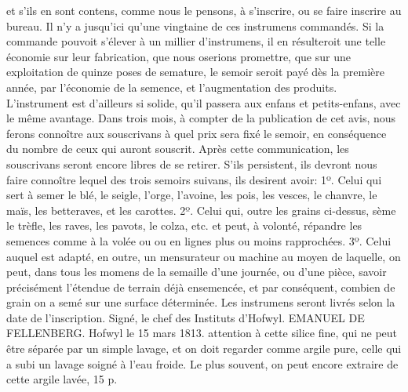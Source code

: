 \setcounter{page}{112} et s'ils en sont contens, comme nous le pensons, à s'inscrire, ou se faire inscrire au bureau. Il n'y a jusqu'ici qu'une vingtaine de ces instrumens commandés. Si la commande pouvoit s'élever à un millier d'instrumens, il en résulteroit une telle économie sur leur fabrication, que nous oserions promettre, que sur une exploitation de quinze poses de semature, le semoir seroit payé dès la première année, par l'économie de la semence, et l'augmentation des produits. L'instrument est d'ailleurs si solide, qu'il passera aux enfans et petits-enfans, avec le même avantage.
Dans trois mois, à compter de la publication de cet avis, nous ferons connoître aux souscrivans à quel prix sera fixé le semoir, en conséquence du nombre de ceux qui auront souscrit. Après cette communication, les souscrivans seront encore libres de se retirer. S'ils persistent, ils devront nous faire connoître lequel des trois semoirs suivans, ils desirent avoir:
1º. Celui qui sert à semer le blé, le seigle, l'orge, l'avoine, les pois, les vesces, le chanvre, le maïs, les betteraves, et les carottes.
2º. Celui qui, outre les grains ci-dessus, sème le trèfle, les raves, les pavots, le colza, etc. et peut, à volonté, répandre les semences comme à la volée ou ou en lignes plus ou moins rapprochées.
3º. Celui auquel est adapté, en outre, un mensurateur ou machine au moyen de laquelle, on peut, dans tous les momens de la semaille d'une journée, ou d'une pièce, savoir précisément l'étendue de terrain déjà ensemencée, et par conséquent, combien de grain on a semé sur une surface déterminée.
Les instrumens seront livrés selon la date de l'inscription.
Signé, le chef des Instituts d'Hofwyl.
EMANUEL DE FELLENBERG.
Hofwyl le 15 mars 1813.\setcounter{page}{113} attention à cette silice fine, qui ne peut être séparée par un simple lavage, et on doit regarder comme argile pure, celle qui a subi un lavage soigné à l'eau froide. Le plus souvent, on peut encore extraire de cette argile lavée, 15 p. %

